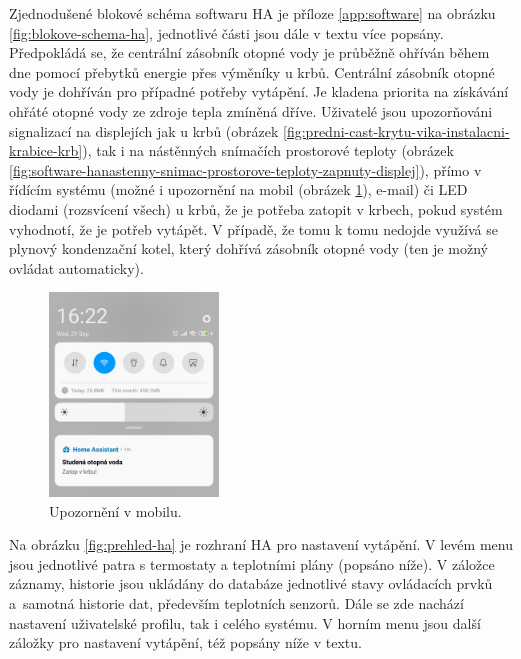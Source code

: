 Zjednodušené blokové schéma softwaru HA je příloze \ref{app:software} na obrázku \ref{fig:blokove-schema-ha}, jednotlivé části jsou dále v textu více popsány. Předpokládá se, že centrální zásobník otopné vody je průběžně ohříván během dne pomocí přebytků energie přes výměníky u krbů. Centrální zásobník otopné vody je dohříván pro případné potřeby vytápění. Je kladena priorita na získávání ohřáté otopné vody ze zdroje tepla zmíněná dříve. Uživatelé jsou upozorňováni signalizací na displejích jak u krbů (obrázek \ref{fig:predni-cast-krytu-vika-instalacni-krabice-krb}), tak i na nástěnných snímačích prostorové teploty (obrázek \ref{fig:software-hanastenny-snimac-prostorove-teploty-zapnuty-displej}), přímo v řídícím systému (možné i upozornění  na mobil (obrázek \ref{fig:mobil-notifikace}), e-mail) či LED diodami (rozsvícení všech) u krbů, že je potřeba zatopit v krbech, pokud systém vyhodnotí, že je potřeb vytápět. V případě, že tomu k tomu nedojde využívá se plynový kondenzační kotel, který dohřívá zásobník otopné vody (ten je možný ovládat automaticky).

\begin{figure}[H]
    \centering
    \includegraphics[width=0.4\textwidth]{images/software-ha/mobil-notifikace.png}
    \caption{Upozornění v mobilu.}
    \label{fig:mobil-notifikace}
\end{figure}

Na obrázku \ref{fig:prehled-ha} je rozhraní HA pro nastavení vytápění. V levém menu jsou jednotlivé patra s termostaty a teplotními plány (popsáno níže). V záložce záznamy, historie jsou ukládány do databáze jednotlivé stavy ovládacích prvků a~samotná historie dat, především teplotních senzorů. Dále se zde nachází nastavení uživatelské profilu, tak i celého systému. V horním menu jsou další záložky pro nastavení vytápění, též popsány níže v textu.

